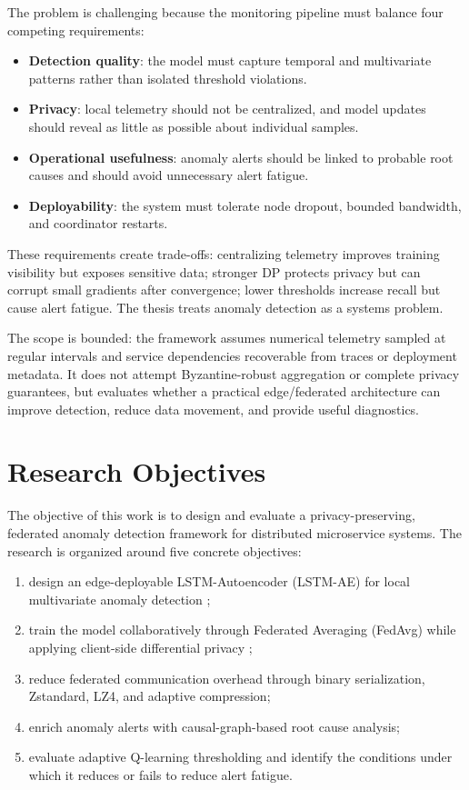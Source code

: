 The problem is challenging because the monitoring pipeline must balance four
competing requirements:

\begin{itemize}
    \item \textbf{Detection quality}: the model must capture temporal and
    multivariate patterns rather than isolated threshold violations.
    \item \textbf{Privacy}: local telemetry should not be centralized, and
    model updates should reveal as little as possible about individual samples.
    \item \textbf{Operational usefulness}: anomaly alerts should be linked to
    probable root causes and should avoid unnecessary alert fatigue.
    \item \textbf{Deployability}: the system must tolerate node dropout,
    bounded bandwidth, and coordinator restarts.
\end{itemize}

These requirements create trade-offs: centralizing telemetry improves training
visibility but exposes sensitive data; stronger DP protects privacy but can
corrupt small gradients after convergence; lower thresholds increase recall but
cause alert fatigue. The thesis treats anomaly detection as a systems problem.

The scope is bounded: the framework assumes numerical telemetry sampled at
regular intervals and service dependencies recoverable from traces or
deployment metadata. It does not attempt Byzantine-robust aggregation or
complete privacy guarantees, but evaluates whether a practical
edge/federated architecture can improve detection, reduce data movement, and
provide useful diagnostics.

\section{Research Objectives}
\label{sec:research_objectives}

The objective of this work is to design and evaluate a privacy-preserving,
federated anomaly detection framework for distributed microservice systems. The
research is organized around five concrete objectives:

\begin{enumerate}
    \item design an edge-deployable LSTM-Autoencoder (LSTM-AE) for local
    multivariate anomaly detection \cite{malhotra2015lstm};
    \item train the model collaboratively through Federated Averaging (FedAvg)
    while applying client-side differential privacy \cite{mcmahan2017communication,
    dwork2006differential, abadi2016deep};
    \item reduce federated communication overhead through binary serialization,
    Zstandard, LZ4, and adaptive compression;
    \item enrich anomaly alerts with causal-graph-based root cause analysis;
    \item evaluate adaptive Q-learning thresholding and identify the conditions
    under which it reduces or fails to reduce alert fatigue.
\end{enumerate}

